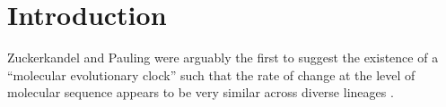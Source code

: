 \section{Introduction} 
Zuckerkandel and Pauling were arguably the first to suggest the existence of a ``molecular evolutionary clock'' such that the rate of change at the level of molecular sequence appears to be very similar across diverse lineages \cite{zuckerkandl1965}.
  
  
  
